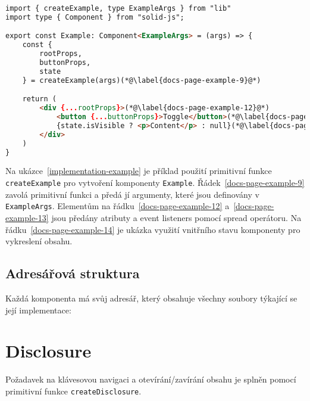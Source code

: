 \begin{lstlisting}[caption={Příklad implementace komponenty pomocí primitivní funkce}, label={implementation-example}, language=html]
import { createExample, type ExampleArgs } from "lib"
import type { Component } from "solid-js";

export const Example: Component<ExampleArgs> = (args) => {
    const {
        rootProps,
        buttonProps,
        state
    } = createExample(args)(*@\label{docs-page-example-9}@*)

    return (
        <div {...rootProps}>(*@\label{docs-page-example-12}@*)
            <button {...buttonProps}>Toggle</button>(*@\label{docs-page-example-13}@*)
            {state.isVisible ? <p>Content</p> : null}(*@\label{docs-page-example-14}@*)
        </div>
    )
}
\end{lstlisting}

Na ukázce~\ref{implementation-example} je příklad použití primitivní funkce \texttt{createExample} pro vytvoření komponenty \texttt{Example}.
Řádek~\ref{docs-page-example-9} zavolá primitivní funkci a předá jí argumenty, které jsou definovány v \texttt{ExampleArgs}.
Elementům na řádku~\ref{docs-page-example-12} a~\ref{docs-page-example-13} jsou předány atributy a event listeners pomocí spread operátoru.
Na řádku~\ref{docs-page-example-14} je ukázka využití vnitřního stavu komponenty pro vykreslení obsahu.

\subsection{Adresářová struktura}

Každá komponenta má svůj adresář, který obsahuje všechny soubory týkající se její implementace:

\vspace{11pt}


\section{Disclosure}

Požadavek na klávesovou navigaci \hyperref[ofr11]{} a otevírání/zavírání obsahu \hyperref[dfr11]{} je splněn pomocí primitivní funkce \texttt{createDisclosure}.

